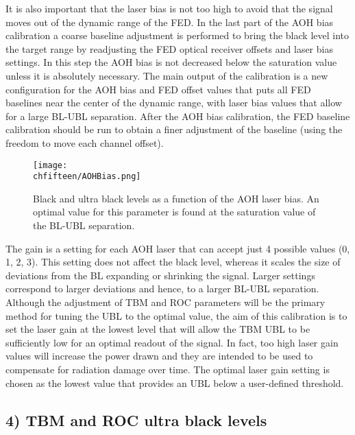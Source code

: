 It is also important that the laser bias is not too high to avoid that the signal moves out of the dynamic range of the FED.
In the last part of the AOH bias calibration a coarse baseline adjustment is performed to bring the black level into the target range by readjusting the FED optical receiver offsets and laser bias settings.
In this step the AOH bias is not decreased below the saturation value unless it is absolutely necessary.
The main output of the calibration is a new configuration for the AOH bias and FED offset values that puts all FED baselines near the center of the dynamic range, with laser bias values that allow for a large BL-UBL separation.
After the AOH bias calibration, the FED baseline calibration should be run to obtain a finer adjustment of the baseline (using the freedom to move each channel offset).

\begin{figure}[!htb]
 \begin{center}
 \texttt{[image: \\chfifteen/AOHBias.png]}
 \end{center}
 \caption{Black and ultra black levels as a function of the AOH laser bias. An optimal value for this parameter is found at the saturation value of the BL-UBL separation.}
 \label{fig:AOHBias}
\end{figure}

The gain is a setting for each AOH laser that can accept just 4 possible values (0, 1, 2, 3).
This setting does not affect the black level, whereas it scales the size of deviations from the BL expanding or shrinking the signal.
Larger settings correspond to larger deviations and hence, to a larger BL-UBL separation.
Although the adjustment of TBM and ROC parameters will be the primary method for tuning the UBL to the optimal value, 
the aim of this calibration is to set the laser gain at the lowest level that will allow the TBM UBL to be sufficiently low for an optimal readout of the signal.
In fact, too high laser gain values will increase the power drawn and they are intended to be used to compensate for radiation damage over time.
The optimal laser gain setting is chosen as the lowest value that provides an UBL below a user-defined threshold.

\subsection*{4) TBM and ROC ultra black levels}

